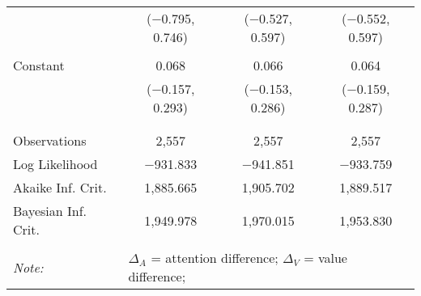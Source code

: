 \begin{table}[h]
\begin{tabular}{@{\extracolsep{5pt}}lccc}
  & ($-$0.795, 0.746) & ($-$0.527, 0.597) & ($-$0.552, 0.597) \\ 
  & & & \\ 
 Constant & 0.068 & 0.066 & 0.064 \\ 
  & ($-$0.157, 0.293) & ($-$0.153, 0.286) & ($-$0.159, 0.287) \\ 
  & & & \\ 
\hline \\[-1.8ex] 
Observations & 2,557 & 2,557 & 2,557 \\ 
Log Likelihood & $-$931.833 & $-$941.851 & $-$933.759 \\ 
Akaike Inf. Crit. & 1,885.665 & 1,905.702 & 1,889.517 \\ 
Bayesian Inf. Crit. & 1,949.978 & 1,970.015 & 1,953.830 \\ 
\hline 
\hline \\[-1.8ex] 
\textit{Note:}  & \multicolumn{3}{l}{\footnotesize $\Delta_A$ = attention difference; $\Delta_V$ = value difference; } \\ 
\end{tabular} 
\end{table} 
